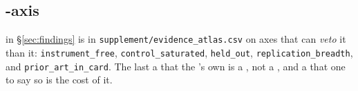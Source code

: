 \subsection{-axis  }

  in §\ref{sec:findings} is  in
\texttt{supplement/evidence\_atlas.csv} on axes that can \emph{veto} it 
than   it: \texttt{instrument\_free}, \texttt{control\_saturated},
\texttt{held\_out}, \texttt{replication\_breadth}, and \texttt{prior\_art\_in\_card}.
The last   a  that  the 's own  is
a , not a , and a  that  one to say so is 
the cost of  it.







